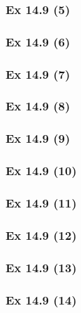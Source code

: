 \subsubsection{Ex 14.9 (5)}\label{sec:Ex_14.9.5}

\subsubsection{Ex 14.9 (6)}\label{sec:Ex_14.9.6}

\subsubsection{Ex 14.9 (7)}\label{sec:Ex_14.9.7}

\subsubsection{Ex 14.9 (8)}\label{sec:Ex_14.9.8}

\subsubsection{Ex 14.9 (9)}\label{sec:Ex_14.9.9}

\subsubsection{Ex 14.9 (10)}\label{sec:Ex_14.9.10}

\newpage		%

\subsubsection{Ex 14.9 (11)}\label{sec:Ex_14.9.11}

\subsubsection{Ex 14.9 (12)}\label{sec:Ex_14.9.12}

\subsubsection{Ex 14.9 (13)}\label{sec:Ex_14.9.13}

\subsubsection{Ex 14.9 (14)}\label{sec:Ex_14.9.14}

